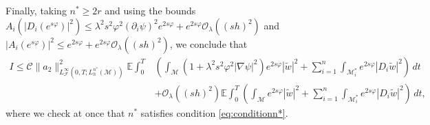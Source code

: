 \documentclass[11pt,oneside,leqno]{amsart}
\numberwithin{equation}{section}
\numberwithin{equation}{section}
\newcommand{\E}{\mathbb{E}}
\begin{document}
Finally, taking $n^*\ge2r$ and using the bounds $\displaystyle A_i(|D_i(e^{s\varphi})|^2)\leq \lambda^2s^2\varphi^2(\partial_i\psi)^2e^{2s\varphi}+e^{2s\varphi}\mathcal{O}_{\lambda}((sh)^2)$ and $|A_i(e^{s\varphi})|^2\leq e^{2s\varphi}+e^{2s\varphi}\mathcal{O}_{\lambda}((sh)^2)$, we conclude that
\begin{equation}\label{eq:conditionn*}
    \begin{split}
I\leq \mathcal{C}\|a_{2}\|^2_{L^{\infty}_{\mathcal{F}}(0,T;L_{h}^{n^{\ast}}(\mathcal{M}))}\E\int_0^T&\left(\int_{\mathcal{M}}\left(1+\lambda^2s^2\varphi^2|\nabla\psi|^2\right)e^{2s\varphi}|\tilde{w}|^{2}+\sum_{i=1}^{n}\int_{\mathcal{M}_i^{\ast}}e^{2s\varphi}|D_i\tilde{w}|^2\right)\,dt\\
&+\mathcal{O}_{\lambda}((sh)^2)\E\int_{0}^T\left(\int_{\mathcal{M}}e^{2s\varphi}|\tilde{w}|^2+\sum_{i=1}^{n}\int_{\mathcal{M}_i^{\ast}}e^{2s\varphi}|D_i\tilde{w}|^2\right)\,dt,
    \end{split}
\end{equation}
where we check at once that $n^\ast$ satisfies condition \eqref{eq:conditionn*}.
\end{document}
